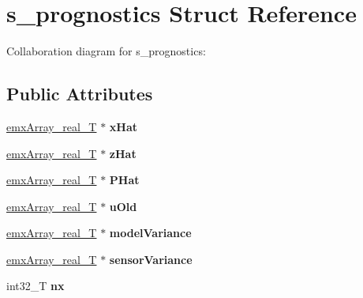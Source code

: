 \hypertarget{structs__prognostics}{}\section{s\+\_\+prognostics Struct Reference}
\label{structs__prognostics}


Collaboration diagram for s\+\_\+prognostics\+:
\subsection*{Public Attributes}
\begin{DoxyCompactItemize}
\item 
\mbox{\label{structs__prognostics_a590c036f8163e123ce7d5bd388168cd7}} 
\hyperlink{structemxArray__real__T}{emx\+Array\+\_\+real\+\_\+T} $\ast$ {\bfseries x\+Hat}
\item 
\mbox{\label{structs__prognostics_a48f61e8b9a5fc49084325e31f0993c08}} 
\hyperlink{structemxArray__real__T}{emx\+Array\+\_\+real\+\_\+T} $\ast$ {\bfseries z\+Hat}
\item 
\mbox{\label{structs__prognostics_a64723582b19f76efab7ae0a30b047425}} 
\hyperlink{structemxArray__real__T}{emx\+Array\+\_\+real\+\_\+T} $\ast$ {\bfseries P\+Hat}
\item 
\mbox{\label{structs__prognostics_a035f7a2f5f367235cde21202338bdd26}} 
\hyperlink{structemxArray__real__T}{emx\+Array\+\_\+real\+\_\+T} $\ast$ {\bfseries u\+Old}
\item 
\mbox{\label{structs__prognostics_ad641358a96189b1761326ec4f7bb6d0b}} 
\hyperlink{structemxArray__real__T}{emx\+Array\+\_\+real\+\_\+T} $\ast$ {\bfseries model\+Variance}
\item 
\mbox{\label{structs__prognostics_a6f519beafe05a39ead0e5aa1106397fb}} 
\hyperlink{structemxArray__real__T}{emx\+Array\+\_\+real\+\_\+T} $\ast$ {\bfseries sensor\+Variance}
\item 
\mbox{\label{structs__prognostics_a510a25a8a3f0592c5cc0bef52cdda628}} 
int32\+\_\+T {\bfseries nx}
\item 

\end{DoxyCompactItemize}
